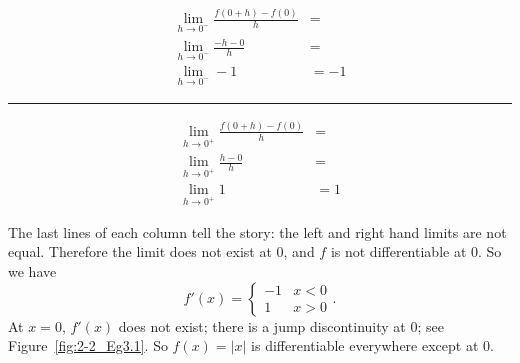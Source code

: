 \begin{example}
\noindent\begin{minipage}[b]{.5\linewidth}
\begin{align*}
\lim_{h \to 0^-} \frac{f(0+h)-f(0)}{h} &= \\
\lim_{h \to 0^-} \frac{-h-0}{h} &= \\
\lim_{h \to 0^-} -1 & =-1
\end{align*}
\end{minipage}\rule{.5pt}{70pt}
\begin{minipage}[b]{.5\linewidth}
\begin{align*}
\lim_{h \to 0^+} \frac{f(0+h)-f(0)}{h} &= \\
\lim_{h \to 0^+} \frac{h-0}{h} &= \\
\lim_{h \to 0^+} 1 & =1
\end{align*}
\end{minipage}
%		
%		
		
The last lines of each column tell the story: the left and right hand limits are not equal. Therefore the limit does not exist at $0$, and $f$ is not differentiable at $0$.
So we have 
\[ f'(x) = \left\{\begin{array}{cc} -1 & x<0 \\ 1 & x>0\end{array}.\right.\] 
At $x=0$, $f'(x)$ does not exist; there is a jump discontinuity at $0$; see Figure~\ref{fig:2-2_Eg3.1}. So $f(x) = |x|$ is differentiable everywhere except at $0$. 
\end{example}

